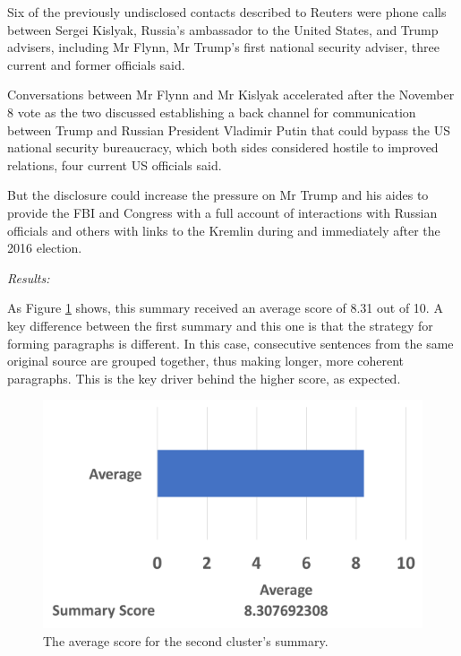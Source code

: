 \documentclass[12pt]{article}
\begin{document}
\begin{mdframed}
Six of the previously undisclosed contacts described to Reuters were phone calls between Sergei Kislyak, Russia's ambassador to the United States, and Trump advisers, including Mr Flynn, Mr Trump's first national security adviser, three current and former officials said.

Conversations between Mr Flynn and Mr Kislyak accelerated after the November 8 vote as the two discussed establishing a back channel for communication between Trump and Russian President Vladimir Putin that could bypass the US national security bureaucracy, which both sides considered hostile to improved relations, four current US officials said.

But the disclosure could increase the pressure on Mr Trump and his aides to provide the FBI and Congress with a full account of interactions with Russian officials and others with links to the Kremlin during and immediately after the 2016 election. \\

\end{mdframed}

\emph{Results:}

As Figure \ref{summ2} shows, this summary received an average score of 8.31 out of 10. A key difference between the first summary and this one is that the strategy for forming paragraphs is different. In this case, consecutive sentences from the same original source are grouped together, thus making longer, more coherent paragraphs. This is the key driver behind the higher score, as expected. \\

\begin{figure}[ht!]
  \centering
    \includegraphics[scale=0.6]{summ2score.png}
   \caption[The average score for a summary]{The average score for the second cluster's summary.}
   \label{summ2}
\end{figure} 
\end{document}
